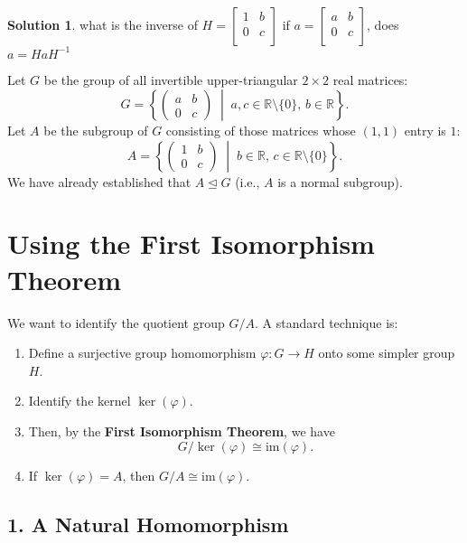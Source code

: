 \documentclass[12pt]{article}
\theoremstyle{definition} %
\newtheorem{solution}{Solution}
\theoremstyle{plain} %
\begin{document}
\begin{solution}
    what is the inverse of $H = \begin{bmatrix}
        1 &  b \\
        0 &  c \\
    \end{bmatrix}$ 
    if $a = \begin{bmatrix}
        a &  b \\
        0 &  c \\
    \end{bmatrix}$, does $a=HaH^{-1}$ 

    Let \( G \) be the group of all invertible upper-triangular \( 2 \times 2 \) real matrices:
\[
G = \left\{
\begin{pmatrix}
a & b \\
0 & c
\end{pmatrix}
\;\middle|\; a, c \in \mathbb{R} \setminus \{0\},\, b \in \mathbb{R}
\right\}.
\]
Let \( A \) be the subgroup of \( G \) consisting of those matrices whose \((1,1)\) entry is \( 1 \):
\[
A = \left\{
\begin{pmatrix}
1 & b \\
0 & c
\end{pmatrix}
\;\middle|\; b \in \mathbb{R},\, c \in \mathbb{R} \setminus \{0\}
\right\}.
\]
We have already established that \( A \trianglelefteq G \) (i.e., \( A \) is a normal subgroup).

\section*{Using the First Isomorphism Theorem}

We want to identify the quotient group \( G / A \). A standard technique is:
\begin{enumerate}
    \item Define a surjective group homomorphism \( \varphi : G \to H \) onto some simpler group \( H \).
    \item Identify the kernel \( \ker(\varphi) \).
    \item Then, by the \textbf{First Isomorphism Theorem}, we have
    \[
    G \big/ \ker(\varphi) \cong \mathrm{im}(\varphi).
    \]
    \item If \( \ker(\varphi) = A \), then \( G / A \cong \mathrm{im}(\varphi) \).
\end{enumerate}

\subsection*{1. A Natural Homomorphism}


\end{solution}
\end{document}

